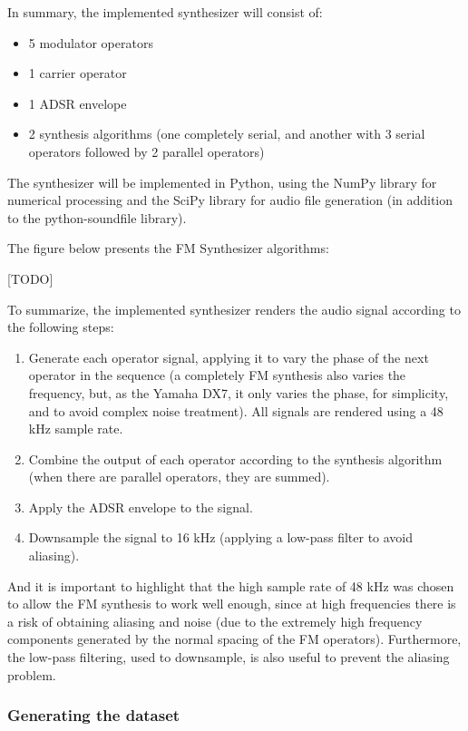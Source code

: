 \documentclass[sigconf,natbib=false]{acmart}
\newcommand{\sergio}[1]{{\color{red}[#1]}}
\begin{document}
In summary, the implemented synthesizer will consist of:

\begin{itemize}
\item 5 modulator operators
\item 1 carrier operator
\item 1 ADSR envelope
\item 2 synthesis algorithms (one completely serial, and another with 3 serial operators followed by 2 parallel operators)
\end{itemize}

The synthesizer will be implemented in Python, using the NumPy library for numerical processing and the SciPy library for audio file generation (in addition to the python-soundfile library).

The figure below presents the FM Synthesizer algorithms:

\sergio{TODO}

To summarize, the implemented synthesizer renders the audio signal according to the following steps:

\begin{enumerate}
\item Generate each operator signal, applying it to vary the phase of the next operator in the sequence (a completely FM synthesis also varies the frequency, but, as the Yamaha DX7, it only varies the phase, for simplicity, and to avoid complex noise treatment). All signals are rendered using a 48 kHz sample rate.
\item Combine the output of each operator according to the synthesis algorithm (when there are parallel operators, they are summed).
\item Apply the ADSR envelope to the signal.
\item Downsample the signal to 16 kHz (applying a low-pass filter to avoid aliasing).
\end{enumerate}

And it is important to highlight that the high sample rate of 48 kHz was chosen to allow the FM synthesis to work well enough, since at high frequencies there is a risk of obtaining aliasing and noise (due to the extremely high frequency components generated by the normal spacing of the FM operators). Furthermore, the low-pass filtering, used to downsample, is also useful to prevent the aliasing problem.

\subsubsection{Generating the dataset}
\end{document}
